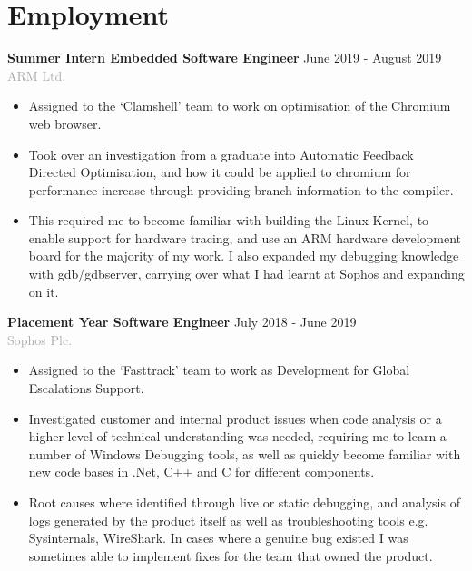 \documentclass[11pt]{article}
\newcommand{\dash}{\item[-]}
\newcommand{\linesep}{\noindent\makebox[\linewidth]{\rule{\linewidth}{0.2pt}}}
\begin{document}
 \section*{Employment}
\textbf{Summer Intern Embedded Software Engineer} \hfill June 2019 - August 2019 \\
\textcolor{darkgray}{ARM Ltd.}
  \begin{itemize}
   \dash Assigned to the ‘Clamshell’ team to work on optimisation of the Chromium web browser.
   \dash Took over an investigation from a graduate into Automatic Feedback Directed Optimisation, and how it could be applied to chromium for performance increase through providing branch information to the compiler.
   \dash This required me to become familiar with building the Linux Kernel, to enable support for hardware tracing, and use an ARM hardware development board for the majority of my work. I also expanded my debugging knowledge with gdb/gdbserver, carrying over what I had learnt at Sophos and expanding on it.
  \end{itemize}
\vspace{10pt}
\textbf{Placement Year Software Engineer} \hfill July 2018 - June 2019 \\
\textcolor{darkgray}{Sophos Plc.}
  \begin{itemize}
   \dash Assigned to the ‘Fasttrack’ team to work as Development for Global Escalations Support.
   \dash Investigated customer and internal product issues when code analysis or a higher level of technical understanding was needed, requiring me to learn a number of Windows Debugging tools, as well as quickly become familiar with new code bases in .Net, C++ and C for different components.
   \dash Root causes where identified through live or static debugging, and analysis of logs generated by the product itself as well as troubleshooting tools e.g. Sysinternals, WireShark. In cases where a genuine bug existed I was sometimes able to implement fixes for the team that owned the product.
  \end{itemize}

  \linesep
\end{document}
